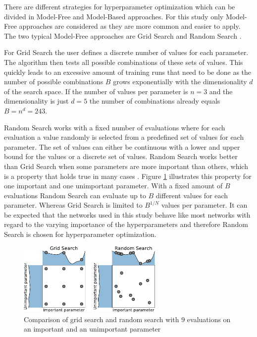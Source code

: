 \documentclass[conference]{IEEEtran}
\begin{document}
There are different strategies for hyperparameter optimization which can be divided in Model-Free and Model-Based approaches. For this study only Model-Free approaches are considered as they are more common and easier to apply. The two typical Model-Free approaches are Grid Search and Random Search \cite{Feurer2019}. 

For Grid Search the user defines a discrete number of values for each parameter. The algorithm then tests all possible combinations of these sets of values. This quickly leads to an excessive amount of training runs that need to be done as the number of possible combinations $ B $ grows exponentially with the dimensionality $ d $ of the search space. If the number of values per parameter is $ n = 3 $ and the dimensionality is just $ d = 5 $ the number of combinations already equals $ B = n^d = 243 $.

Random Search works with a fixed number of evaluations where for each evaluation a value randomly is selected from a predefined set of values for each parameter. The set of values can either be continuous with a lower and upper bound for the values or a discrete set of values. Random Search works better than Grid Search when some parameters are more important than others, which is a property that holds true in many cases \cite{Feurer2019}. Figure \ref{fig:grid_search_random_search} illustrates this property for one important and one unimportant parameter. With a fixed amount of $ B $ evaluations Random Search can evaluate up to $ B $ different values for each parameter. Whereas Grid Search is limited to $ B^{1/N} $ values per parameter. It can be expected that the networks used in this study behave like most networks with regard to the varying importance of the hyperparameters and therefore Random Search is chosen for hyperparameter optimization.

\begin{figure}[htp]
	\centering
	\includegraphics[width=7cm]{grid_search_random_search.pdf}
	\caption{Comparison of grid search and random search with 9 evaluations on an important and an unimportant parameter  \cite{Feurer2019}}
	\label{fig:grid_search_random_search}
\end{figure}
\end{document}
